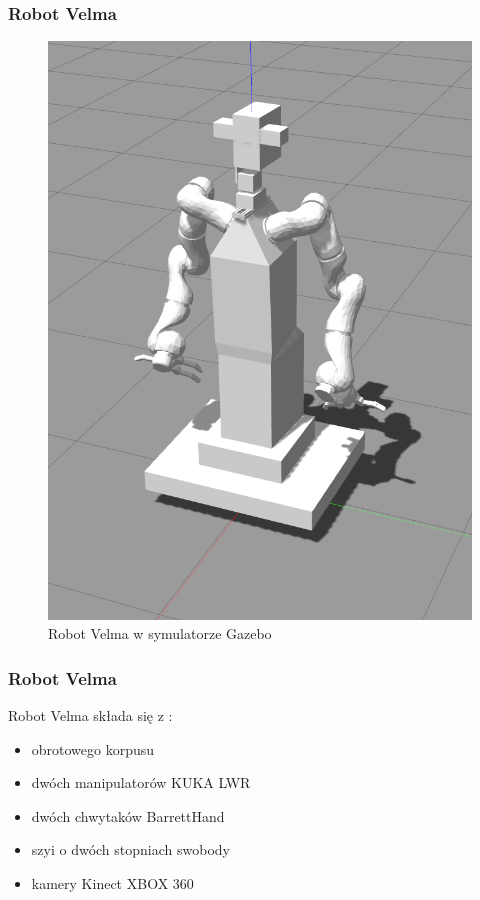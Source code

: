 \begin{frame}
\frametitle{Robot Velma}
\begin{figure}
	\includegraphics[scale=0.20]{./images/velma_gz_cropped.png}
	\caption{Robot Velma w symulatorze Gazebo}
\end{figure}
\end{frame}


\begin{frame}
\frametitle{Robot Velma}
Robot Velma składa się z \cite{docsVelma}:  
\begin{itemize}
	\item obrotowego korpusu
	\item dwóch manipulatorów KUKA LWR
	\item dwóch chwytaków BarrettHand
	\item szyi o dwóch stopniach swobody
	\item kamery Kinect XBOX 360
\end{itemize}
\end{frame}

